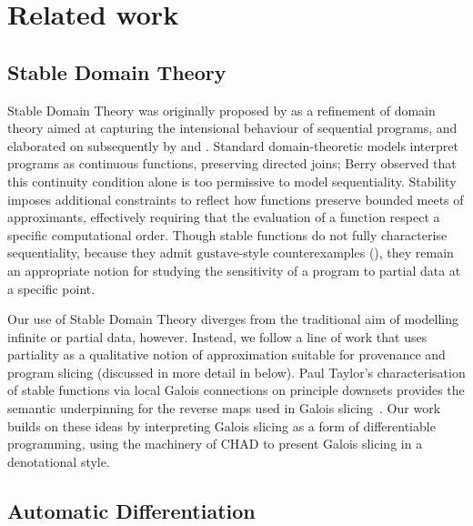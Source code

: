 \section{Related work}
\label{sec:related-work}

\subsection{Stable Domain Theory}

Stable Domain Theory was originally proposed by \citet{berry79} as a refinement of domain theory aimed at
capturing the intensional behaviour of sequential programs, and elaborated on subsequently by \citet{berry82}
and \citet{amadio-curien}. Standard domain-theoretic models interpret programs as continuous functions,
preserving directed joins; Berry observed that this continuity condition alone is too permissive to model
sequentiality. Stability imposes additional constraints to reflect how functions preserve bounded meets of
approximants, effectively requiring that the evaluation of a function respect a specific computational order.
Though stable functions do not fully characterise sequentiality, because they admit $\mathrm{gustave}$-style
counterexamples (), they remain an appropriate notion for studying the sensitivity of a
program to partial data at a specific point.

Our use of Stable Domain Theory diverges from the traditional aim of modelling infinite or partial data,
however. Instead, we follow a line of work that uses partiality as a qualitative notion of approximation
suitable for provenance and program slicing (discussed in more detail in 
below). Paul Taylor’s characterisation of stable functions via local Galois connections on principle downsets
provides the semantic underpinning for the reverse maps used in Galois slicing~\cite{taylor99}. Our work
builds on these ideas by interpreting Galois slicing as a form of differentiable programming, using the
machinery of CHAD to present Galois slicing in a denotational style.

\subsection{Automatic Differentiation}

